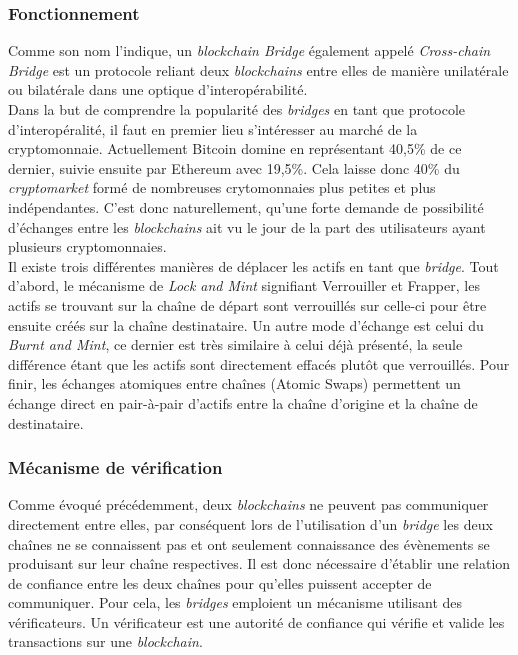 
\subsubsection{Fonctionnement}

Comme son nom l’indique, un \textit{\gls{blockchain} Bridge} également appelé \textit{\gls{Cross-chain} Bridge} est un protocole reliant deux \textit{\gls{blockchain}s} entre elles de manière unilatérale ou bilatérale dans une optique d’interopérabilité.\\

Dans la but de comprendre la popularité des \textit{bridges} en tant que protocole d’interopéralité, il faut en premier lieu s’intéresser au marché de la cryptomonnaie. Actuellement Bitcoin domine en représentant 40,5\% de ce dernier, suivie ensuite par Ethereum avec 19,5\%. Cela laisse donc 40\% du \textit{cryptomarket} formé de nombreuses crytomonnaies plus petites et plus indépendantes. C’est donc naturellement, qu’une forte demande de possibilité d’échanges entre les \textit{\gls{blockchain}s} ait vu le jour de la part des utilisateurs ayant plusieurs cryptomonnaies\cite{NgraveNumbers}.\\

Il existe trois différentes manières de déplacer les \gls{actif}s en tant que \textit{bridge}. Tout d’abord, le mécanisme de \textit{Lock and Mint} signifiant Verrouiller et Frapper, les \gls{actif}s se trouvant sur la chaîne de départ sont verrouillés sur celle-ci pour être ensuite créés sur la chaîne destinataire. Un autre mode d'échange est celui du \textit{Burnt and Mint}, ce dernier est très similaire à celui déjà présenté, la seule différence étant que les \gls{actif}s sont directement effacés plutôt que verrouillés. Pour finir, les échanges atomiques entre chaînes (Atomic Swaps) permettent un échange direct en pair-à-pair d'\gls{actif}s entre la chaîne d’origine et la chaîne de destinataire.\cite{EthereumMechanism}

\subsubsection{Mécanisme de vérification}

Comme évoqué précédemment, deux \textit{\gls{blockchain}s} ne peuvent pas communiquer directement entre elles, par conséquent lors de l’utilisation d’un \textit{bridge} les deux chaînes ne se connaissent pas et ont seulement connaissance des évènements se produisant sur leur chaîne respectives. Il est donc nécessaire d’établir une relation de confiance entre les deux chaînes pour qu’elles puissent accepter de communiquer. Pour cela, les \textit{bridges} emploient un mécanisme utilisant des vérificateurs. Un vérificateur est une autorité de confiance qui vérifie et valide les transactions sur une \textit{\gls{blockchain}}. \\


